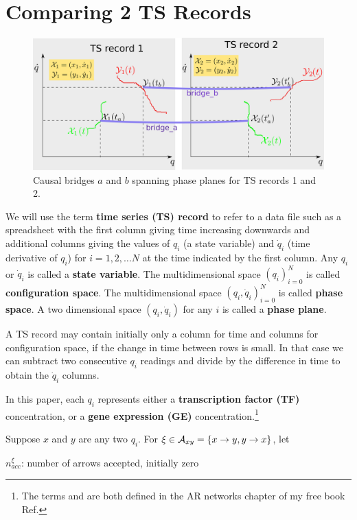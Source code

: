 \documentclass[12pt]{article}
\begin{document}
\section{Comparing 2 TS Records}
\begin{figure}[h!]
\centering
\includegraphics[width=5in]
{two-phase-plane-bridges.png}
\caption{Causal bridges $a$ and $b$ spanning
	phase planes for
TS records 1 and 2.}
\label{fig-two-phase-plane-bridges}
\end{figure}

We will use the term {\bf time series (TS) record}
to refer to
a data file such as a spreadsheet with the first column 
giving time increasing downwards and additional columns giving the values
of $q_i$ (a state variable) and $\dot{q}_i$ (time derivative of $q_i$) for $i=1, 2, \ldots N$
at the time indicated by the first column.
Any $q_i$ or $\dot{q}_i$ is called a {\bf state variable}.
The multidimensional space $(q_i)_{i=0}^{N}$
is called {\bf configuration space}.
The multidimensional space $(q_i, \dot{q}_i)_{i=0}^{N}$
is called {\bf phase space}.
A two dimensional space $(q_i, \dot{q}_i)$ for any 
$i$ is called a {\bf phase plane}.

A TS record may contain initially only a column 
for time and columns for configuration space,
if the change in time between rows is small. 
In that case we can subtract two consecutive
$q_i$ readings and divide by the difference
in time to obtain the $\dot{q}_i$ columns.

In this paper, each $q_i$ represents either a {\bf transcription
factor (TF)} concentration, or a {\bf gene expression (GE)} concentration.\footnote{The 
terms 
and  are both defined
in the AR networks chapter of my free book Ref.\cite{Bayesuvius}}


Suppose $x$ and $y$
are any two $q_i$. For $\xi \in
{\cal A}_{xy}=
\{x\rightarrow y, y\rightarrow x\}$, let

$n_{acc}^{\xi}$: number of arrows 
accepted, initially zero
\end{document}
